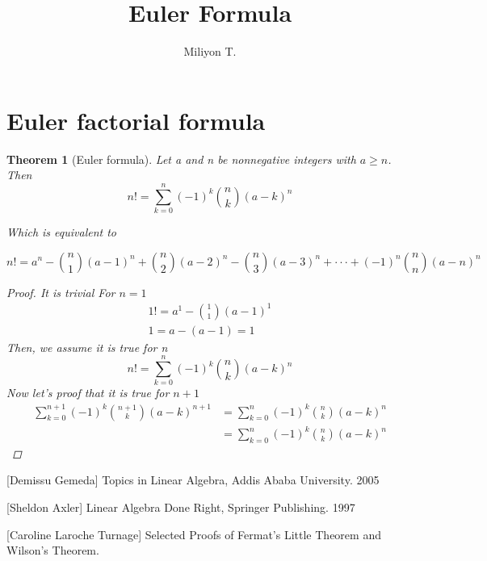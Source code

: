 \documentclass[12pt]{article}
\newtheorem{thm}{Theorem}[section]
\begin{document}
\nocite{}

\title{\textbf{Euler Formula}}

\author{Miliyon T.}
\maketitle


\section{Euler factorial formula}

\begin{thm}[Euler formula]
Let  a and n be nonnegative integers with $a\geq n$. Then
$$ n!=\sum_{k=0}^n (-1)^k\binom{n}{k}(a-k)^n $$

Which is equivalent to

$$
n!=a^n - \binom{n}{1}(a-1)^n + \binom{n}{2}(a-2)^n - \binom{n}{3}(a-3)^n + \cdot\cdot\cdot + (-1)^n\binom{n}{n}(a-n)^n $$

\begin{proof}
It is trivial For $n=1$ 
\begin{align*}
1!=a^1-\binom{1}{1}(a-1)^1 \\
1=a-(a-1)=1
\end{align*}
Then, we assume it is true for n
$$ n!=\sum_{k=0}^n (-1)^k\binom{n}{k}(a-k)^n $$
Now let's proof that it is true for $n+1$
\begin{align*}
\sum_{k=0}^{n+1} (-1)^k\binom{n+1}{k}(a-k)^{n+1}&=\sum_{k=0}^n (-1)^k\binom{n}{k}(a-k)^n \\
&=\sum_{k=0}^n (-1)^k\binom{n}{k}(a-k)^n
\end{align*}


\end{proof}
\end{thm} 


 \begin{thebibliography}{9}

[Demissu Gemeda]
Topics in Linear Algebra,
Addis Ababa University. 2005

[Sheldon Axler]
Linear Algebra Done Right,
Springer Publishing. 1997

[Caroline Laroche Turnage]
Selected Proofs of Fermat's Little Theorem  and Wilson's Theorem.

\end{thebibliography}
\end{document}
